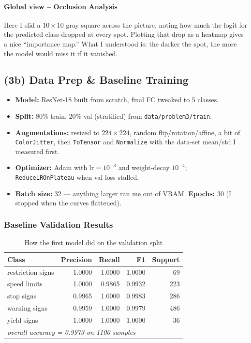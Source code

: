 \documentclass[10pt]{article}
\begin{document}
\paragraph{Global view – Occlusion Analysis}  
Here I slid a $10\times10$ gray square across the picture, noting how much the logit for the predicted class dropped at every spot. Plotting that drop as a heatmap gives a nice “importance map.” What I understood is: the darker the spot, the more the model would miss it if it vanished.

\subsection*{(3b) Data Prep \& Baseline Training}

\begin{itemize}
  \item \textbf{Model:} ResNet-18 built from scratch, final FC tweaked to 5 classes.
  \item \textbf{Split:} 80\% train, 20\% val (stratified) from \texttt{data/problem3/train}.
  \item \textbf{Augmentations:} resized to $224\times224$, random flip/rotation/affine, a bit of \texttt{ColorJitter}, then \texttt{ToTensor} and \texttt{Normalize} with the data-set mean/std I measured first.
  \item \textbf{Optimizer:} Adam with $\text{lr}=10^{-3}$ and weight-decay $10^{-4}$; \texttt{ReduceLROnPlateau} when val loss stalled.
  \item \textbf{Batch size:} 32 — anything larger ran me out of VRAM.  
        \textbf{Epochs:} 30 (I stopped when the curves flattened).
\end{itemize}

\subsubsection*{Baseline Validation Results}

\begin{table}[H]
  \centering
  \caption{How the first model did on the validation split}
  \begin{tabular}{lrrrr}
    \toprule
    Class & Precision & Recall & F1 & Support \\
    \midrule
    restriction signs & 1.0000 & 1.0000 & 1.0000 & 69 \\
    speed limits      & 1.0000 & 0.9865 & 0.9932 & 223 \\
    stop signs        & 0.9965 & 1.0000 & 0.9983 & 286 \\
    warning signs     & 0.9959 & 1.0000 & 0.9979 & 486 \\
    yield signs       & 1.0000 & 1.0000 & 1.0000 & 36  \\
    \midrule
    \multicolumn{4}{l}{\it overall accuracy = 0.9973 on 1100 samples} & \\
    \bottomrule
  \end{tabular}
\end{table}
\end{document}
